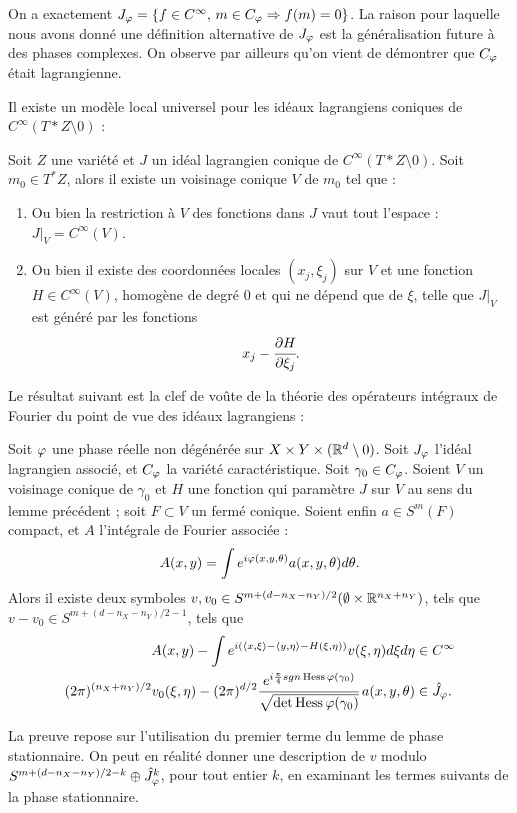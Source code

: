 On a exactement $J_{\varphi}=\{f \in C^{\infty},\, m \in C_{\varphi}\Rightarrow f(m)=0\}$. La raison pour laquelle nous avons donné une définition alternative de $J_{\varphi}$ est la généralisation future à des phases complexes. On observe par ailleurs qu'on vient de démontrer que $C_{\varphi}$ était lagrangienne.

Il existe un modèle local universel pour les idéaux lagrangiens coniques de $C^{\infty}(T*Z \setminus 0)$ :
\begin{lem}
	Soit $Z$ une variété et $J$ un idéal lagrangien conique de $C^{\infty}(T*Z \setminus 0)$. Soit $m_0\in T^*Z$, alors il existe un voisinage conique $V$ de $m_0$ tel que :
	\begin{enumerate}
		\item Ou bien la restriction à $V$ des fonctions dans $J$ vaut tout l'espace : $J|_V = C^{\infty}(V)$.
		\item Ou bien il existe des coordonnées locales $(x_j,\xi_j)$ sur $V$ et une fonction $H\in C^{\infty}(V)$, homogène de degré 0 et qui ne dépend que de $\xi$, telle que $J|_{V}$ est généré par les fonctions
		\begin{equation*}
			x_j-\cfrac{\partial H}{\partial \xi_j}.
		\end{equation*}
	\end{enumerate} 
\end{lem}

Le résultat suivant est la clef de voûte de la théorie des opérateurs intégraux de Fourier du point de vue des idéaux lagrangiens :

\begin{theorem}[Hormander]
	Soit $\varphi$ une phase réelle non dégénérée sur $X \times Y \times (\mathbb{R}^d \setminus 0)$. Soit $J_\varphi$ l'idéal lagrangien associé, et $C_{\varphi}$ la variété caractéristique. Soit $\gamma_0\in C_{\varphi}$. Soient $V$ un voisinage conique de $\gamma_0$ et $H$ une fonction qui paramètre $J$ sur $V$ au sens du lemme précédent ; soit $F \subset V$ un fermé conique. Soient enfin $a \in S^m(F)$ compact, et $A$ l'intégrale de Fourier associée :
	\begin{equation*}
		A(x,y)=\int e^{i\varphi(x,y,\theta)}a(x,y,\theta)d\theta.
	\end{equation*}
	Alors il existe deux symboles $v,v_0 \in S^{m + (d-n_X-n_Y)/2}(\emptyset \times \mathbb{R}^{n_X+n_Y})$, tels que $v-v_0 \in S^{m + (d-n_X-n_Y)/2-1}$, tels que 
	\begin{align*}
		A(x,y)-\int e^{i(\langle x,\xi\rangle-\langle y,\eta\rangle - H(\xi,\eta))}v(\xi,\eta)d\xi d\eta &\in C^{\infty}\\
		(2\pi)^{(n_X+n_Y)/2}v_0(\xi,\eta)-(2\pi)^{d/2}\cfrac{e^{i \frac{\pi}{4}sgn\operatorname{Hess} \varphi(\gamma_0)} }{\sqrt{\det\operatorname{Hess} \varphi (\gamma_0)}}\:a(x,y,\theta) &\in \hat{J}_{\varphi}.
	\end{align*}
\end{theorem}
La preuve repose sur l'utilisation du premier terme du lemme de phase stationnaire. On peut en réalité donner une description de $v$ modulo $S^{m + (d-n_X-n_Y)/2-k}\oplus \hat{J}_{\varphi}^k$, pour tout entier $k$, en examinant les termes suivants de la phase stationnaire.

